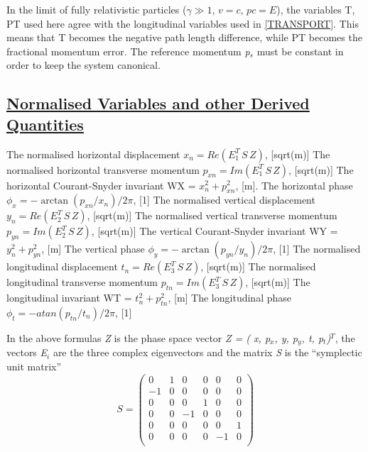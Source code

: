 In the limit of fully relativistic particles ($\gamma \gg 1$, $v = c$,
$p c = E$), the variables T, PT used here agree with the
longitudinal variables used in
\href{bibliography.html#transport}{[TRANSPORT]}. This means that T
becomes the negative path length difference, while PT becomes the
fractional momentum error. The reference momentum \textit{p$_s$} must be
constant in order to keep the system canonical.  

\subsection{\href{normal}{Normalised Variables and other Derived Quantities}}
\label{subsec:tables_normal}
\begin{madlist}
   The normalised horizontal displacement 
  $x_n = Re ( E_1^T \, S\, Z )$, [sqrt(m)]
   The normalised horizontal transverse momentum 
  $p_{xn} = Im ( E_1^T\, S\, Z )$, [sqrt(m)]
   The horizontal Courant-Snyder invariant 
  WX = $x_n^2 + p_{xn}^2$, [m].    
   The horizontal phase 
  $\phi_x = -\arctan ( p_{xn} / x_n ) / 2 \pi$, [1]
   The normalised vertical displacement 
  $y_n = Re ( E_2^T \,S\, Z )$, [sqrt(m)]
   The normalised vertical transverse momentum 
  $p_{yn} = Im ( E_2^T\, S\, Z )$, [sqrt(m)]
   The vertical Courant-Snyder invariant 
  WY = $y_n^2 + p_{yn}^2$, [m]
   The vertical phase 
  $\phi_y = - \arctan ( p_{yn} / y_n ) / 2 \pi$, [1]
   The normalised longitudinal displacement 
  $t_n = Re ( E_3^T \,S\, Z )$, [sqrt(m)]
   The normalised longitudinal transverse momentum 
  $p_{tn} = Im ( E_3^T\, S\, Z )$, [sqrt(m)]
   The longitudinal invariant 
  WT = $t_n^2 + p_{tn}^2$, [m]
   The longitudinal phase 
  $\phi_t = - atan ( p_{tn} / t_n ) / 2 \pi$, [1]
\end{madlist} 

In the above formulas \textit{Z} is the phase space vector
\textit{Z = ( x, p$_x$, y, p$_y$, t, p$_t$)$^T$}, the vectors
\textit{E$_i$} are the three complex eigenvectors and  
the matrix \textit{S} is the ``symplectic unit matrix'' 
\[
S =
 \begin{pmatrix}
  0 & 1 & 0 & 0 & 0 & 0 \\
  -1 & 0 & 0 & 0 & 0 & 0 \\
  0 & 0 & 0 & 1 & 0 & 0 \\
  0 & 0 & -1 & 0 & 0 & 0 \\
  0 & 0 & 0 & 0 & 0 & 1 \\
  0 & 0 & 0 & 0 & -1 & 0 \\
 \end{pmatrix}
\]


